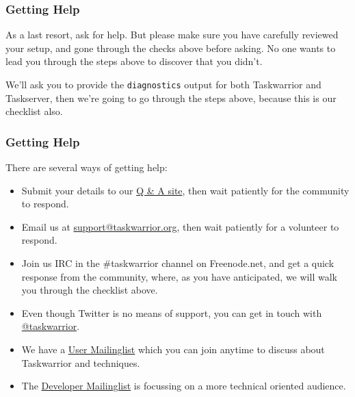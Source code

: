 \documentclass[t,handout]{beamer}
\begin{document}
\begin{frame}[fragile]\frametitle{Getting Help}
    As a last resort, ask for help. But please make sure you have carefully reviewed your setup, and gone through the checks above before asking. No one wants to lead you through the steps above to discover that you didn't.

    We'll ask you to provide the \verb+diagnostics+ output for both Taskwarrior and Taskserver, then we're going to go through the steps above, because this is our checklist also.
\end{frame}

\begin{frame}[fragile]\frametitle{Getting Help}
    There are several ways of getting help:

    \begin{itemize}
        \item Submit your details to our \href{https://answers.tasktools.org}{Q \& A site}, then wait patiently for the community to respond.
        \item Email us at \href{mailto:support@taskwarrior.org}{support@taskwarrior.org}, then wait patiently for a volunteer to respond.
        \item Join us IRC in the \#taskwarrior channel on Freenode.net, and get a quick response from the community, where, as you have anticipated, we will walk you through the checklist above.
        \item Even though Twitter is no means of support, you can get in touch with \href{https://twitter.com/taskwarrior}{@taskwarrior}.
        \item We have a \href{https://groups.google.com/forum/\#!forum/taskwarrior-user}{User Mailinglist} which you can join anytime to discuss about Taskwarrior and techniques.
        \item The \href{https://groups.google.com/forum/\#!forum/taskwarrior-dev}{Developer Mailinglist} is focussing on a more technical oriented audience.
    \end{itemize}

\end{frame}

\end{document}
